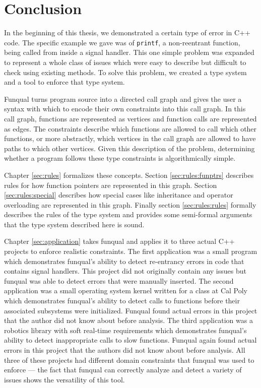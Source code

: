 \chapter{Conclusion}\label{sec:conclusion}

In the beginning of this thesis, we demonstrated a certain type of error in C++ code.  The specific example we gave was of \lstinline{printf}, a non-reentrant function, being called from inside a signal handler.  This one simple problem was expanded to represent a whole class of issues which were easy to describe but difficult to check using existing methods.  To solve this problem, we created a type system and a tool to enforce that type system. 

Funqual turns program source into a directed call graph and gives the user a syntax with which to encode their own constraints into this call graph.  In this call graph, functions are represented as vertices and function calls are represented as edges.  The constraints describe which functions are allowed to call which other functions, or more abstractly, which vertices in the call graph are allowed to have paths to which other vertices.  Given this description of the problem, determining whether a program follows these type constraints is algorithmically simple.  

Chapter \ref{sec:rules} formalizes these concepts.  Section \ref{sec:rules:funptrs} describes rules for how function pointers are represented in this graph.  Section \ref{sec:rules:special} describes how special cases like inheritance and operator overloading are represented in this graph.  Finally section \ref{sec:rules:rules} formally describes the rules of the type system and provides some semi-formal arguments that the type system described here is sound.  

Chapter \ref{sec:application} takes funqual and applies it to three actual C++ projects to enforce realistic constraints.  The first application was a small program which demonstrates funqual's ability to detect re-entrancy errors in code that contains signal handlers.  This project did not originally contain any issues but funqual was able to detect errors that were manually inserted.  The second application was a small operating system kernel written for a class at Cal Poly which demonstrates funqual's ability to detect calls to functions before their associated subsystems were initialized.  Funqual found actual errors in this project that the author did not know about before analysis.  The third application was a robotics library with soft real-time requirements which demonstrates funqual's ability to detect inappropriate calls to slow functions.  Funqual again found actual errors in this project that the authors did not know about before analysis.  All three of these projects had different domain constraints that funqual was used to enforce --- the fact that funqual can correctly analyze and detect a variety of issues shows the versatility of this tool.  

